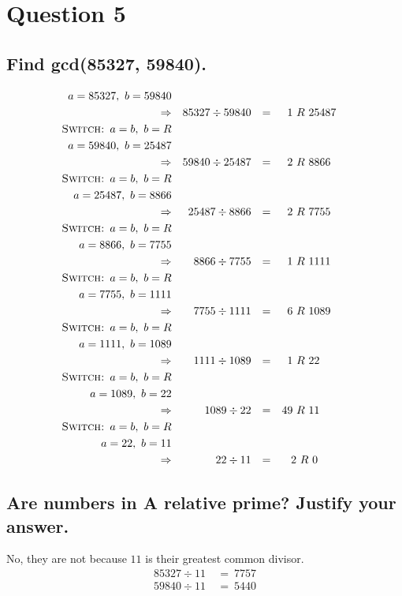 \documentclass{report}
\begin{document}
	\section{Question 5}
	\startsection
		\renewcommand{\thesubsection}{\thesection.\Alph{subsection}}
		\subsection{Find gcd(85327, 59840).}
		\begin{align*}
			a = 85327, \ b = 59840 \\
			\Rightarrow && 85327 \div 59840 && = && 1 \ & R \ 25487 \\
			\textsc{Switch: } a = b, \ b = R \\
			a = 59840, \ b = 25487 \\
			\Rightarrow && 59840 \div 25487 && = && 2 \ & R \ 8866 \\
			\textsc{Switch: } a = b, \ b = R \\
			a = 25487, \ b = 8866 \\
			\Rightarrow && 25487 \div 8866 && = && 2 \ & R \ 7755 \\
			\textsc{Switch: } a = b, \ b = R \\
			a = 8866, \ b = 7755 \\
			\Rightarrow && 8866 \div 7755 && = && 1 \ & R \ 1111 \\
			\textsc{Switch: } a = b, \ b = R \\
			a = 7755, \ b = 1111 \\
			\Rightarrow && 7755 \div 1111 && = && 6 \ & R \ 1089 \\
			\textsc{Switch: } a = b, \ b = R \\
			a = 1111, \ b = 1089 \\
			\Rightarrow && 1111 \div 1089 && = && 1 \ & R \ 22 \\
			\textsc{Switch: } a = b, \ b = R \\
			a = 1089, \ b = 22 \\
			\Rightarrow && 1089 \div 22 && = && 49 \ & R \ 11 \\
			\textsc{Switch: } a = b, \ b = R \\
			a = 22, \ b = 11 \\
			\Rightarrow && 22 \div 11 && = && 2 & \ R \ 0 \\
		\end{align*}
		\subsection{Are numbers in A relative prime? Justify your answer.}
		\startsubsection
			No, they are not because $11$ is their greatest common divisor.
			\begin{align*}
				85327 \div 11 \ &= \ 7757 \\
				59840 \div 11 \ &= \ 5440
			\end{align*}
		\closesection
\end{document}
